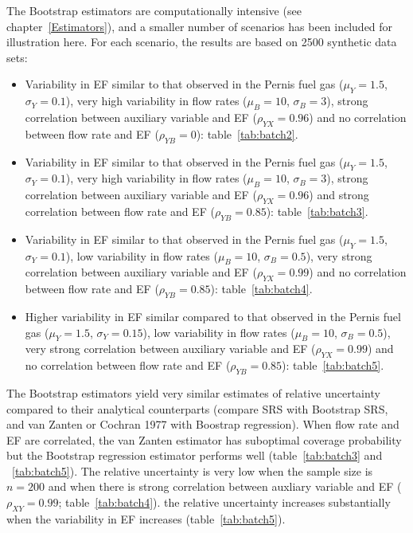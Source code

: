 The Bootstrap estimators are computationally intensive (see chapter~\ref{Estimators}), and a smaller number of  scenarios has been included for illustration here. For each scenario, the results are based on 2500 synthetic data sets: 
\begin{itemize}
	\item Variability in EF similar to that observed in the Pernis fuel gas ($\mu_Y=1.5$, $\sigma_Y=0.1$), very high variability in flow rates ($\mu_B=10$, $\sigma_B=3$), strong correlation between auxiliary variable and EF ($\rho_{YX}=0.96$) and no correlation between flow rate and EF ($\rho_{YB}=0$): table~\ref{tab:batch2}.
	\item Variability in EF similar to that observed in the Pernis fuel gas ($\mu_Y=1.5$, $\sigma_Y=0.1$), very high variability in flow rates ($\mu_B=10$, $\sigma_B=3$), strong correlation between auxiliary variable and EF ($\rho_{YX}=0.96$) and strong correlation between flow rate and EF ($\rho_{YB}=0.85$): table~\ref{tab:batch3}.
	\item Variability in EF similar to that observed in the Pernis fuel gas ($\mu_Y=1.5$, $\sigma_Y=0.1$), low variability in flow rates ($\mu_B=10$, $\sigma_B=0.5$), very strong correlation between auxiliary variable and EF ($\rho_{YX}=0.99$) and no correlation between flow rate and EF ($\rho_{YB}=0.85$): table~\ref{tab:batch4}.
	\item Higher variability in EF similar compared to that observed in the Pernis fuel gas ($\mu_Y=1.5$, $\sigma_Y=0.15$), low variability in flow rates ($\mu_B=10$, $\sigma_B=0.5$), very strong correlation between auxiliary variable and EF ($\rho_{YX}=0.99$) and no correlation between flow rate and EF ($\rho_{YB}=0.85$): table~\ref{tab:batch5}.
\end{itemize}

The Bootstrap estimators yield very similar estimates of relative uncertainty compared to their analytical counterparts (compare SRS with Bootstrap SRS, and van Zanten or Cochran 1977 with Boostrap regression). When flow rate and EF are correlated, the van Zanten estimator has suboptimal coverage probability but the Bootstrap regression estimator performs well (table~\ref{tab:batch3} and ~\ref{tab:batch5}). The relative uncertainty is very low when the sample size is $n=200$ and when there is strong correlation between auxliary variable and EF ($\rho_{XY}=0.99$; table~\ref{tab:batch4}). the relative uncertainty increases substantially when the variability in EF increases (table~\ref{tab:batch5}).

